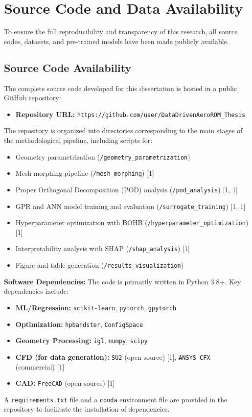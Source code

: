 \documentclass[dsc, EN]{ufabcFHZh}
\begin{document}
{\chapter{Source Code and Data Availability}
\label{app:code_data}

To ensure the full reproducibility and transparency of this research, all source codes, datasets, and pre-trained models have been made publicly available.

\section{Source Code Availability}
\label{sec:code_availability}

The complete source code developed for this dissertation is hosted in a public GitHub repository:
\begin{itemize}
    \item \textbf{Repository URL:} \texttt{https://github.com/user/DataDrivenAeroROM\_Thesis}
\end{itemize}
The repository is organized into directories corresponding to the main stages of the methodological pipeline, including scripts for:
\begin{itemize}
    \item Geometry parametrization (\texttt{/geometry\_parametrization})
    \item Mesh morphing pipeline (\texttt{/mesh\_morphing}) {[1]}
    \item Proper Orthogonal Decomposition (POD) analysis (\texttt{/pod\_analysis}) {[1, 1]}
    \item GPR and ANN model training and evaluation (\texttt{/surrogate\_training}) {[1, 1]}
    \item Hyperparameter optimization with BOHB (\texttt{/hyperparameter\_optimization}) {[1]}
    \item Interpretability analysis with SHAP (\texttt{/shap\_analysis}) {[1]}
    \item Figure and table generation (\texttt{/results\_visualization})
\end{itemize}

\noindent\textbf{Software Dependencies:}
The code is primarily written in Python 3.8+. Key dependencies include:
\begin{itemize}
    \item \textbf{ML/Regression:} \texttt{scikit-learn}, \texttt{pytorch}, \texttt{gpytorch}
    \item \textbf{Optimization:} \texttt{hpbandster}, \texttt{ConfigSpace}
    \item \textbf{Geometry Processing:} \texttt{igl}, \texttt{numpy}, \texttt{scipy}
    \item \textbf{CFD (for data generation):} \texttt{SU2} (open-source) {[1]}, \texttt{ANSYS CFX} (commercial) {[1]}
    \item \textbf{CAD:} \texttt{FreeCAD} (open-source) {[1]}
\end{itemize}
A \texttt{requirements.txt} file and a \texttt{conda} environment file are provided in the repository to facilitate the installation of dependencies.

}
\end{document}

